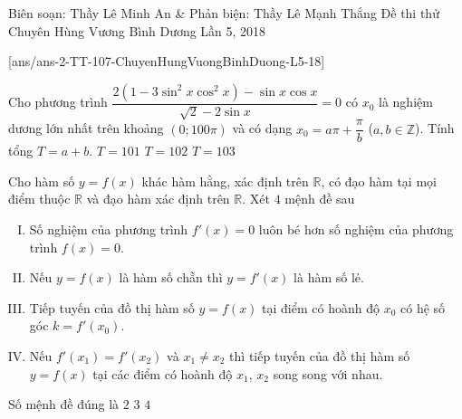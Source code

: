 \begin{name}
{Biên soạn: Thầy Lê Minh An \& Phản biện: Thầy Lê Mạnh Thắng}
{Đề thi thử Chuyên Hùng Vương Bình Dương Lần 5, 2018}
\end{name}
\setcounter{ex}{0}
[ans/ans-2-TT-107-ChuyenHungVuongBinhDuong-L5-18]
\allowdisplaybreaks
\begin{ex}%
Cho phương trình $\dfrac{2\left(1-3\sin^2 x\cos^2 x\right)-\sin x\cos x}{\sqrt{2}-2\sin x}=0$ có $x_0$ là nghiệm dương lớn nhất trên khoảng $(0;100\pi)$ và có dạng $x_0=a\pi+\dfrac{\pi}{b}$ ($a,b\in\mathbb{Z}$). Tính tổng $T=a+b$.
{$T=101$}
{$T=102$}
{\True $T=103$}
\end{ex}

\begin{ex}%
Cho hàm số $y=f(x)$ khác hàm hằng, xác định trên $\mathbb{R}$, có đạo hàm tại mọi điểm thuộc $\mathbb{R}$ và đạo hàm xác định trên $\mathbb{R}$. Xét $4$ mệnh đề sau
\begin{enumerate}[(I)]
\item Số nghiệm của phương trình $f'(x)=0$ luôn bé hơn số nghiệm của phương trình $f(x)=0$.
\item Nếu $y=f(x)$ là hàm số chẵn thì $y=f'(x)$ là hàm số lẻ.
\item Tiếp tuyến của đồ thị hàm số $y=f(x)$ tại điểm có hoành độ $x_0$ có hệ số góc $k=f'(x_0)$.
\item Nếu $f'(x_1)=f'(x_2)$ và $x_1\neq x_2$ thì tiếp tuyến của đồ thị hàm số $y=f(x)$ tại các điểm có hoành độ $x_1$, $x_2$ song song với nhau.
\end{enumerate}
Số mệnh đề đúng là
{\True $2$}
{$3$}
{$4$}
\end{ex}

